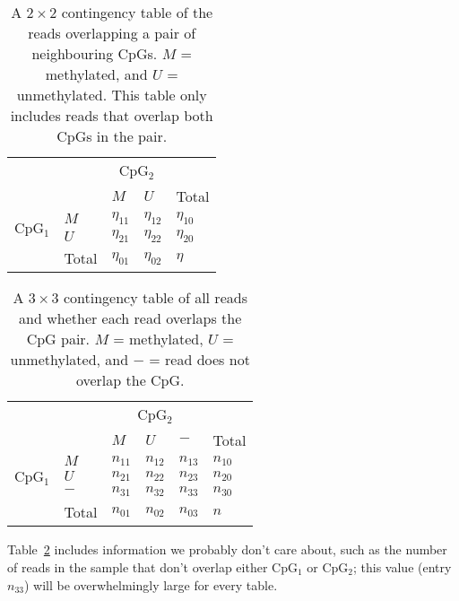 \documentclass[a4paper]{article}
\begin{document}
\begin{table}[htdp]
\caption{A $2\times 2$ contingency table of the reads overlapping a pair of neighbouring CpGs. $M$ = methylated, and $U$ = unmethylated. This table only includes reads that overlap both CpGs in the pair.}
\centering
\begin{tabular}{l l l l l}
\toprule
 & & \multicolumn{2}{c}{CpG$_2$} & \\
\cmidrule(lr{0.95em}){3-4}
 & & $M$ & $U$ & Total \\
\midrule
\multirow{2}{*}{CpG$_1$} & $M$ & $\eta_{11}$ & $\eta_{12}$ & $\eta_{10}$ \\
 & $U$ & $\eta_{21}$ & $\eta_{22}$ & $\eta_{20}$ \\
\midrule
 & Total & $\eta_{01}$ & $\eta_{02}$ & $\eta$ \\
\bottomrule
\end{tabular}
\label{tab:2x2}
\end{table}%

\begin{table}[htdp]
\caption{A $3\times 3$ contingency table of all reads and whether each read overlaps the CpG pair. $M$ = methylated, $U$ = unmethylated, and $-$ = read does not overlap the CpG.}
\centering
\begin{tabular}{l l l l l l}
\toprule
 & & \multicolumn{3}{c}{CpG$_2$} & \\
\cmidrule(lr{0.95em}){3-5}
 & & $M$ & $U$ & $-$ & Total \\
\midrule
\multirow{3}{*}{CpG$_1$} & $M$ & $n_{11}$ & $n_{12}$ & $n_{13}$ & $n_{10}$ \\
 & $U$ & $n_{21}$ & $n_{22}$ & $n_{23}$ & $n_{20}$ \\
 & $-$ & $n_{31}$ & $n_{32}$ & $n_{33}$ & $n_{30}$ \\
\midrule
 & Total & $n_{01}$ & $n_{02}$ & $n_{03}$ & $n$ \\
\bottomrule
\end{tabular}
\label{tab:3x3}
\end{table}%

Table~\ref{tab:3x3} includes information we probably don't care about, such as the number of reads in the sample that don't overlap either CpG$_1$ or CpG$_2$; this value (entry $n_{33}$) will be overwhelmingly large for every table.
\end{document}
